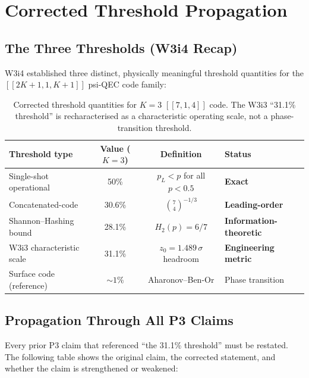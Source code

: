 \documentclass[11pt]{article}
\theoremstyle{definition}
\theoremstyle{remark}
\begin{document}
\section{Corrected Threshold Propagation}
\label{sec:threshold-propagation}

\subsection{The Three Thresholds (W3i4 Recap)}
\label{sec:three-thresholds}

W3i4 established three distinct, physically meaningful threshold quantities
for the $[[2K+1,1,K+1]]$ psi-QEC code family:

\begin{table}[h]
\centering
\caption{Corrected threshold quantities for $K=3$ $[[7,1,4]]$ code.
  The W3i3 ``31.1\% threshold'' is recharacterised as a characteristic
  operating scale, not a phase-transition threshold.}
\label{tab:corrected-thresholds}
\begin{tabular}{@{}lccl@{}}
\toprule
Threshold type & Value ($K=3$) & Definition & Status \\
\midrule
Single-shot operational & 50\% & $p_L < p$ for all $p < 0.5$ & \textbf{Exact} \\
Concatenated-code & 30.6\% & $\binom{7}{4}^{-1/3}$ & \textbf{Leading-order} \\
Shannon--Hashing bound & 28.1\% & $H_2(p) = 6/7$ & \textbf{Information-theoretic} \\
W3i3 characteristic scale & 31.1\% & $z_0 = 1.489\,\sigma$ headroom & \textbf{Engineering metric} \\
Surface code (reference) & $\sim1\%$ & Aharonov--Ben-Or & Phase transition \\
\bottomrule
\end{tabular}
\end{table}

\subsection{Propagation Through All P3 Claims}
\label{sec:claim-propagation}

Every prior P3 claim that referenced ``the 31.1\% threshold'' must be restated.
The following table shows the original claim, the corrected statement, and
whether the claim is strengthened or weakened:
\end{document}
